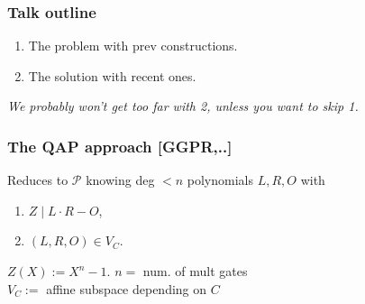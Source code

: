 \documentclass[shadesubsections,trans,14pt,mathserif]{beamer}
\newcommand{\prv}{\ensuremath{\mathcal{P}}}
\begin{document}
\begin{frame}
\frametitle{Talk outline}   %
 
  \begin{enumerate}
\item The problem with prev constructions.
 \item The solution with recent ones.
\end{enumerate}
 \vspace{0.2in}
\emph{We probably won't get too far with 2, unless you want to skip 1.}

\end{frame}


% 
% 
% 
% 
% 
% 
% 
% 
% 




\begin{frame}
\frametitle{The QAP approach \normalsize{[GGPR,..]}}   %
 Reduces to $\prv$ 
knowing deg $<n$ polynomials $L,R,O$ with
\begin{enumerate}
 \item $Z\mid L\cdot R - O$, 
 \item $(L,R,O)\in V_C$.
\end{enumerate}
 \vspace{0.2in}
 $Z(X):= X^n-1$. $n=$ num. of mult gates  \\
\vspace{0.2in}
\noindent
$V_C:=$ affine subspace depending on $C$ 
 \end{frame}
\end{document}
